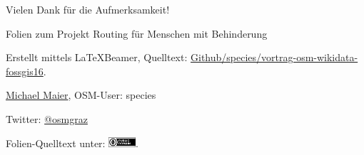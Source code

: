 \documentclass{beamer}
\begin{document}
\begin{frame}{Vielen Dank für die Aufmerksamkeit!}

  Folien zum Projekt Routing für Menschen mit Behinderung
\vspace{1cm}

Erstellt mittels \LaTeX Beamer, Quelltext: \href{https://github.com/species/vortrag-osm-wikidata-fossgis16}{Github/species/vortrag-osm-wikidata-fossgis16}.
\vspace{1cm}

\href{mailto:michael.maier@mailbox.org}{Michael Maier}, OSM-User: species

Twitter: \href{https://twitter.com/osmgraz}{@osmgraz}
\vspace{1cm}

Folien-Quelltext unter: \includegraphics[width=1cm]{cc-zero.pdf}. 

\end{frame}
\end{document}
